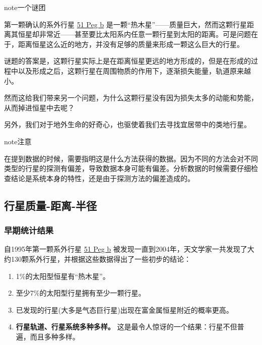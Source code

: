 \documentclass[letterpaper,10pt,english]{sphinxmanual}
\begin{document}
\begin{notice}{note}{一个谜团}

第一颗确认的系外行星 \href{http://zh.wikipedia.org/zh-cn/\%E9\%A3\%9B\%E9\%A6\%AC\%E5\%BA\%A751b}{51 Peg b} 是一颗“热木星”——质量巨大，然而这颗行星距离其恒星却非常近——甚至要比太阳系内任意一颗行星到太阳的距离。可是问题在于，距离恒星这么近的地方，并没有足够的质量来形成一颗这么巨大的行星。

谜题的答案是，这颗行星实际上是在距离恒星更远的地方形成的，但是在形成的过程中以及形成之后，这颗行星在周围物质的作用下，逐渐损失能量，轨道原来越小。

然而这给我们带来另一个问题，为什么这颗行星没有因为损失太多的动能和势能，从而掉进恒星中去呢？
\end{notice}

另外，我们对于地外生命的好奇心，也驱使着我们去寻找宜居带中的类地行星。

\begin{notice}{note}{注意}

在提到数据的时候，需要指明这是什么方法获得的数据。因为不同的方法会对不同类型的行星的探测有偏差，导致数据本身可能有偏差。分析数据的时候需要仔细检查结论是系统本身的特性，还是由于探测方法的偏差造成的。
\end{notice}


\subsection{行星质量-距离-半径}
\label{statistics:id2}

\subsubsection{早期统计结果}
\label{statistics:id3}
自1995年第一颗系外行星 \href{http://zh.wikipedia.org/zh-cn/\%E9\%A3\%9B\%E9\%A6\%AC\%E5\%BA\%A751b}{51 Peg b} 被发现一直到2004年，天文学家一共发现了大约130颗系外行星，并根据这些数据得出了一些初步的结论：
\begin{enumerate}
\item {} 
1\%的太阳型恒星有“热木星”。

\item {} 
至少7\%的太阳型行星拥有至少一颗行星。

\item {} 
已发现的行星(大多是气态巨行星)出现在富金属恒星附近的概率更高。

\item {} 
\textbf{行星轨道、行星系统多种多样。} 这是最令人惊讶的一个结果：行星不但普遍，而且多种多样。

\end{enumerate}
\end{document}
